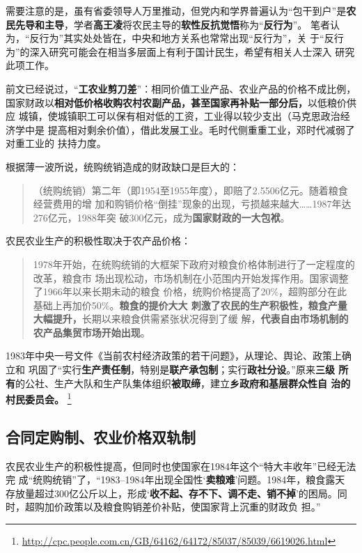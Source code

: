需要注意的是，虽有省委领导人万里推动，但党内和学界普遍认为“包干到户”是\textbf{农
  民先导和主导}，学者\textbf{高王凌}将农民主导的\textbf{软性反抗觉悟}称为“\textbf{反行为}”。
笔者认为，“反行为”其实处处皆在，中央和地方关系也常常出现“反行为”，关
于“反行为”的深入研究可能会在相当多层面上有利于国计民生，希望有相关人士深入
研究此项工作。

前文已经说过，“\textbf{工农业剪刀差}”：相同价值工业产品、农业产品的价格不成比例，
国家财政以\textbf{相对低价格收购农村农副产品，甚至国家再补贴一部分后，}以低粮价供应
城镇，使城镇职工可以保有相对低的工资，工业得以较少支出（马克思政治经济学中是
提高相对剩余价值），借此发展工业。毛时代侧重重工业，邓时代减弱了对重工业的
扶持力度。

根据薄一波所说，统购统销造成的财政缺口是巨大的：
\begin{quotation}
  （统购统销）第二年（即1954至1955年度），即赔了2.5506亿元。随着粮食经营费用的增
  加和购销价格“倒挂”现象的出现，亏损越来越大……1987年达276亿元，1988年突
  破300亿元，成为\textbf{国家财政的一大包袱}。\cite[281]{boyibo}
\end{quotation}

农民农业生产的积极性取决于农产品价格：
\begin{quotation}
  1978年开始，在统购统销的大框架下政府对粮食价格体制进行了一定程度的改革，粮食市
  场出现松动，市场机制在小范围内开始发挥作用。国家调整了1966年以来长期未动的粮食
  价格，统购价格提高了20\%，超购部分在此基础上再加价50\%。\textbf{粮食的提价大大
    刺激了农民的生产积极性，粮食产量大幅提升，}长期以来粮食供需紧张状况得到了缓
  解，\textbf{代表自由市场机制的农产品集贸市场开始出现}。\cite{taochangsheng}
\end{quotation}

1983年中央一号文件《当前农村经济政策的若干问题》，从理论、舆论、政策上确立和
巩固了“实行\textbf{生产责任制}，特别是\textbf{联产承包制}；实行\textbf{政社分设}。”原来\textbf{三级
  所有}的公社、生产大队和生产队集体组织\textbf{被取缔}，建立\textbf{乡政府和基层群众性自
  治的村民委员会。}
\footnote{\url{http://cpc.people.com.cn/GB/64162/64172/85037/85039/6619026.html}}

\subsection{合同定购制、农业价格双轨制}
\label{sec:nongshuanggui}

农民农业生产的积极性提高，但同时也使国家在1984年这个“特大丰收年”已经无法完
成“统购统销”了，“1983--1984年出现全国性‘\textbf{卖粮难}’问题。1984年，粮食露天
存放量超过300亿公斤以上，形成‘\textbf{收不起、存不下、调不走、销不掉}’的困局。同
时，超购加价政策以及粮食购销差价补贴，使国家背上沉重的财政负
担。”\cite{liangshi40}

